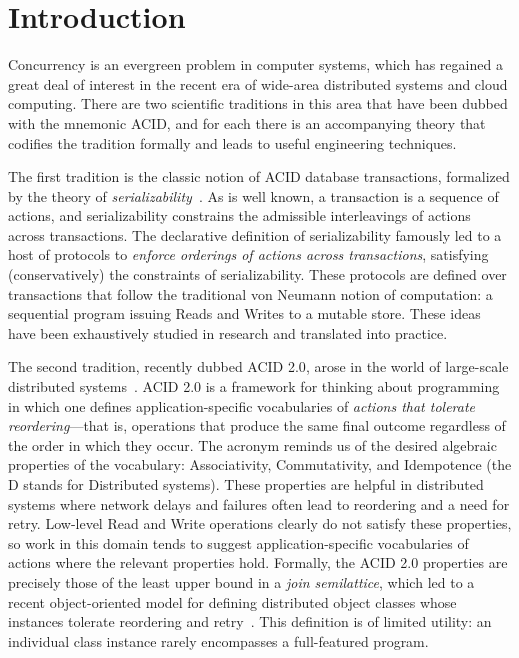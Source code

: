 \documentclass{sig-alternate}
\begin{document}
\section{Introduction}
Concurrency is an evergreen problem in computer systems, which has regained a
great deal of interest in the recent era of wide-area distributed systems and
cloud computing.  There are two scientific traditions in this area that have
been dubbed with the mnemonic \textsf{ACID}, and for each there is an
accompanying theory that codifies the tradition formally and leads to useful
engineering techniques.

The first tradition is the classic notion of \textsf{ACID} database
transactions, formalized by the theory of \emph{serializability}~\cite{Papadimitriou1979}.
As is well known, a transaction is a sequence of actions, and serializability
constrains the admissible interleavings of actions across transactions.  The
declarative definition of serializability famously led to a host of protocols to
\emph{enforce orderings of actions across transactions}, satisfying
(conservatively) the constraints of serializability.  These protocols are
defined over transactions that follow the traditional von Neumann notion of
computation: a sequential program issuing Reads and Writes to a mutable store.
These ideas have been exhaustively studied in research and translated into
practice.

The second tradition, recently dubbed \textsf{ACID 2.0}, arose in the world of
large-scale distributed systems~\cite{Helland2009}.  ACID 2.0 is a framework for
thinking about programming in which one defines application-specific
vocabularies of \emph{actions that tolerate reordering}---that is, operations
that produce the same final outcome regardless of the order in which they occur.
The acronym reminds us of the desired algebraic properties of the vocabulary:
Associativity, Commutativity, and Idempotence (the D stands for Distributed
systems).  These properties are helpful in distributed systems where network
delays and failures often lead to reordering and a need for retry. Low-level
Read and Write operations clearly do not satisfy these properties, so work in
this domain tends to suggest application-specific vocabularies of actions where
the relevant properties hold.  Formally, the ACID 2.0 properties are precisely
those of the least upper bound in a \emph{join semilattice}, which led to a
recent object-oriented model for defining distributed object classes whose
instances tolerate reordering and retry~\cite{Shapiro2011a,Shapiro2011b}.  This
definition is of limited utility: an individual class instance rarely
encompasses a full-featured program.
\end{document}
